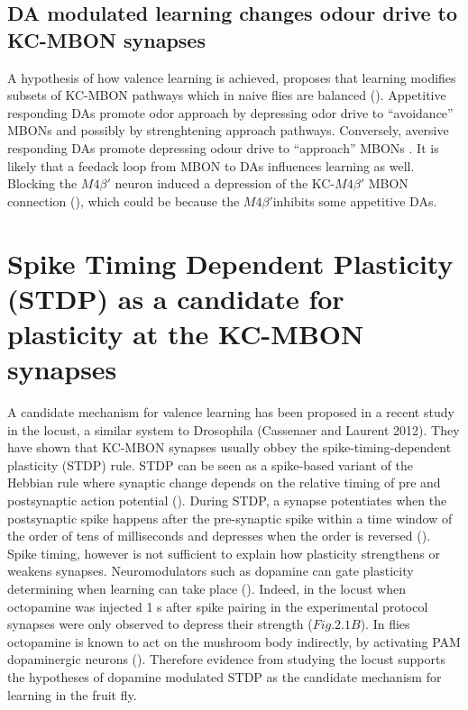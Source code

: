 \subsection{DA modulated learning changes odour drive to KC-MBON synapses}

A hypothesis of how valence learning is achieved, proposes that learning
modifies subsets of KC-MBON pathways which in naive flies are balanced
(\citealp{Owald:2015cn}). Appetitive responding DAs promote odor
approach by depressing odor drive to ``avoidance'' MBONs and possibly
by strenghtening approach pathways. Conversely, aversive responding
DAs promote depressing odour drive to ``approach'' MBONs \citep{Aso:2014bh}.
It is likely that a feedack loop from MBON to DAs influences learning
as well. Blocking the $M4\beta'$ neuron induced a depression of the
KC-$M4\beta'$ MBON connection (\citealp{Owald:2015cn}), which could
be because the $M4\beta'$inhibits some appetitive DAs. 


\section{Spike Timing Dependent Plasticity (STDP) as a candidate for plasticity
at the KC-MBON synapses}

A candidate mechanism for valence learning has been proposed in a
recent study in the locust, a similar system to Drosophila (Cassenaer
and Laurent 2012). They have shown that KC-MBON synapses usually obbey
the spike-timing-dependent plasticity (STDP) rule. STDP can be seen
as a spike-based variant of the Hebbian rule where synaptic change
depends on the relative timing of pre and postsynaptic action potential
(\citealp{Bi:1998ve}). During STDP, a synapse potentiates when the
postsynaptic spike happens after the pre-synaptic spike within a time
window of the order of tens of milliseconds and depresses when the
order is reversed (\citealp{Bi:1998ve}). Spike timing, however is
not sufficient to explain how plasticity strengthens or weakens synapses.
Neuromodulators such as dopamine can gate plasticity determining when
learning can take place (\citet{Pawlak:2010cn}). Indeed, in the locust
when octopamine was injected 1 s after spike pairing in the experimental
protocol synapses were only observed to depress their strength ($Fig.2.1B$).
In flies octopamine is known to act on the mushroom body indirectly,
by activating PAM dopaminergic neurons (\citealp{Waddell:2013fu}).
Therefore evidence from studying the locust supports the hypotheses
of dopamine modulated STDP as the candidate mechanism for learning
in the fruit fly. 


